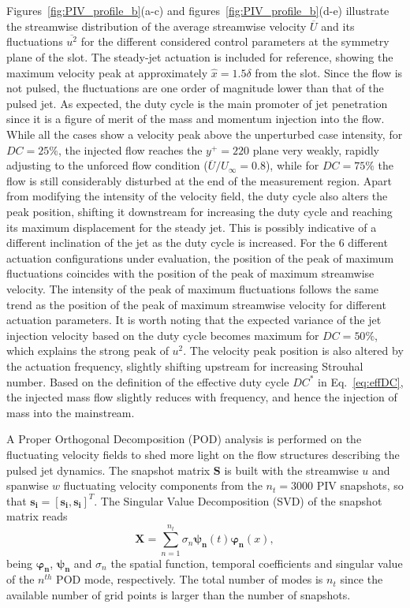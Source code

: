 Figures~\ref{fig:PIV_profile_b}(a-c) and figures~\ref{fig:PIV_profile_b}(d-e) illustrate the streamwise distribution of the average streamwise velocity $\overline{U}$ and its fluctuations $\overline{u^2}$ for the different considered control parameters at the symmetry plane of the slot. The steady-jet actuation is included for reference, showing the maximum velocity peak at approximately $\hat{x} = 1.5\delta$ from the slot. Since the flow is not pulsed, the fluctuations are one order of magnitude lower than that of the pulsed jet. As expected, the duty cycle is the main promoter of jet penetration since it is a figure of merit of the mass and momentum injection into the flow. While all the cases show a velocity peak above the unperturbed case intensity, for $DC = 25\%$, the injected flow reaches the $y^+=220$ plane very weakly, rapidly adjusting to the unforced flow condition ($\overline{U}/U_\infty=0.8$), while for $DC = 75\%$ the flow is still considerably disturbed at the end of the measurement region. Apart from modifying the intensity of the velocity field, the duty cycle also alters the peak position, shifting it downstream for increasing the duty cycle and reaching its maximum displacement for the steady jet. This is possibly indicative of a different inclination of the jet as the duty cycle is increased. For the 6 different actuation configurations under evaluation, the position of the peak of maximum fluctuations coincides with the position of the peak of maximum streamwise velocity. The intensity of the peak of maximum fluctuations follows the same trend as the position of the peak of maximum streamwise velocity for different actuation parameters.  It is worth noting that the expected variance of the jet injection velocity based on the duty cycle becomes maximum for $DC = 50\%$, which explains the strong peak of $u^2$. The velocity peak position is also altered by the actuation frequency, slightly shifting upstream for increasing Strouhal number. Based on the definition of the effective duty cycle $DC^*$ in Eq.~\eqref{eq:effDC}, the injected mass flow slightly reduces with frequency, and hence the injection of mass into the mainstream.

A Proper Orthogonal Decomposition (POD) analysis is performed on the fluctuating velocity fields to shed more light on the flow structures describing the pulsed jet dynamics. The snapshot matrix $\boldsymbol{S}$ is built with the streamwise $u$ and spanwise $w$ fluctuating velocity components from the $n_t = 3000$ PIV snapshots, so that $\boldsymbol{s_i} = [\boldsymbol{s_i},\boldsymbol{s_i}]^T$. The Singular Value Decomposition (SVD) of the snapshot matrix reads
\begin{equation}
    \boldsymbol{X} = \sum_{n = 1}^{n_t} \sigma_n \boldsymbol{\psi_n}(t)\boldsymbol{\varphi_n}(x),
    \label{eq:SVD}
\end{equation}
being $\boldsymbol{\varphi_n}$, $\boldsymbol{\psi_n}$ and ${\sigma_n}$ the spatial function, temporal coefficients and singular value of the $n^{th}$ POD mode, respectively. The total number of modes is $n_t$ since the available number of grid points is larger than the number of snapshots.

